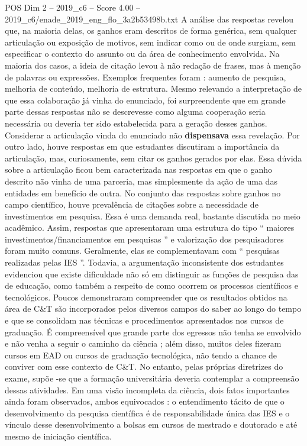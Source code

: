 \begin{textsample}{POS Dim 2 – 2019\_c6 – Score 4.00 – 2019\_c6/enade\_2019\_eng\_flo\_3a2b53498b.txt}
A análise das respostas revelou que, na maioria delas, os ganhos eram descritos de forma genérica, sem qualquer articulação ou exposição de motivos, sem indicar como ou de onde surgiam, sem especificar o contexto do assunto ou da área de conhecimento envolvida.
Na maioria dos casos, a ideia de citação levou à não redação de frases, mas à menção de palavras ou expressões.
Exemplos frequentes foram : aumento de pesquisa, melhoria de conteúdo, melhoria de estrutura.
Mesmo relevando a interpretação de que essa colaboração já vinha do enunciado, foi surpreendente que em grande parte dessas respostas não se descrevesse como alguma cooperação seria necessária ou deveria ter sido estabelecida para a geração desses ganhos.
Considerar a articulação vinda do enunciado não \textbf{dispensava} essa revelação.
Por outro lado, houve respostas em que estudantes discutiram a importância da articulação, mas, curiosamente, sem citar os ganhos gerados por elas.
Essa dúvida sobre a articulação ficou bem caracterizada nas respostas em que o ganho descrito não vinha de uma parceria, mas simplesmente da ação de uma das entidades em benefício de outra.
No conjunto das respostas sobre ganhos no campo científico, houve prevalência de citações sobre a necessidade de investimentos em pesquisa.
Essa é uma demanda real, bastante discutida no meio acadêmico.
Assim, respostas que apresentaram uma estrutura do tipo “ maiores investimentos/financiamentos em pesquisas ” e valorização dos pesquisadores foram muito comuns.
Geralmente, elas se complementavam com “ pesquisas realizadas pelas IES ”.
Todavia, a argumentação inconsistente dos estudantes evidenciou que existe dificuldade não só em distinguir as funções de pesquisa das de educação, como também a respeito de como ocorrem os processos científicos e tecnológicos.
Poucos demonstraram compreender que os resultados obtidos na área de C\&T são incorporados pelos diversos campos do saber ao longo do tempo e que se consolidam nas técnicas e procedimentos apresentados nos cursos de graduação.
É compreensível que grande parte dos egressos não tenha se envolvido e não venha a seguir o caminho da ciência ; além disso, muitos deles fizeram cursos em EAD ou cursos de graduação tecnológica, não tendo a chance de conviver com esse contexto de C\&T.
No entanto, pelas próprias diretrizes do exame, supõe -se que a formação universitária deveria contemplar a compreensão dessas atividades.
Em uma visão incompleta da ciência, dois fatos importantes ainda foram observados, ambos equivocados : o entendimento tácito de que o desenvolvimento da pesquisa científica é de responsabilidade única das IES e o vínculo desse desenvolvimento a bolsas em cursos de mestrado e doutorado e até mesmo de iniciação científica.

\end{textsample}
